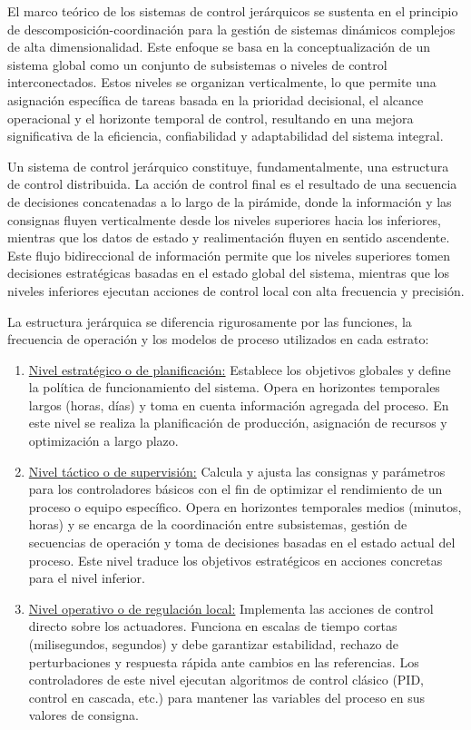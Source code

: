 El marco teórico de los sistemas de control jerárquicos se sustenta en el principio de descomposición-coordinación para la gestión de sistemas dinámicos complejos de alta dimensionalidad. Este enfoque se basa en la conceptualización de un sistema global como un conjunto de subsistemas o niveles de control interconectados. Estos niveles se organizan verticalmente, lo que permite una asignación específica de tareas basada en la prioridad decisional, el alcance operacional y el horizonte temporal de control, resultando en una mejora significativa de la eficiencia, confiabilidad y adaptabilidad del sistema integral.

Un sistema de control jerárquico constituye, fundamentalmente, una estructura de control distribuida. La acción de control final es el resultado de una secuencia de decisiones concatenadas a lo largo de la pirámide, donde la información y las consignas fluyen verticalmente desde los niveles superiores hacia los inferiores, mientras que los datos de estado y realimentación fluyen en sentido ascendente. Este flujo bidireccional de información permite que los niveles superiores tomen decisiones estratégicas basadas en el estado global del sistema, mientras que los niveles inferiores ejecutan acciones de control local con alta frecuencia y precisión.

La estructura jerárquica se diferencia rigurosamente por las funciones, la frecuencia de operación y los modelos de proceso utilizados en cada estrato:
\begin{enumerate}

\item \underline{Nivel estratégico o de planificación:} Establece los objetivos globales y define la política de funcionamiento del sistema. Opera en horizontes temporales largos (horas, días) y toma en cuenta información agregada del proceso. En este nivel se realiza la planificación de producción, asignación de recursos y optimización a largo plazo.

\item \underline{Nivel táctico o de supervisión:} Calcula y ajusta las consignas y parámetros para los controladores básicos con el fin de optimizar el rendimiento de un proceso o equipo específico. Opera en horizontes temporales medios (minutos, horas) y se encarga de la coordinación entre subsistemas, gestión de secuencias de operación y toma de decisiones basadas en el estado actual del proceso. Este nivel traduce los objetivos estratégicos en acciones concretas para el nivel inferior.

\item \underline{Nivel operativo o de regulación local:} Implementa las acciones de control directo sobre los actuadores. Funciona en escalas de tiempo cortas (milisegundos, segundos) y debe garantizar estabilidad, rechazo de perturbaciones y respuesta rápida ante cambios en las referencias. Los controladores de este nivel ejecutan algoritmos de control clásico (PID, control en cascada, etc.) para mantener las variables del proceso en sus valores de consigna.

\end{enumerate}

